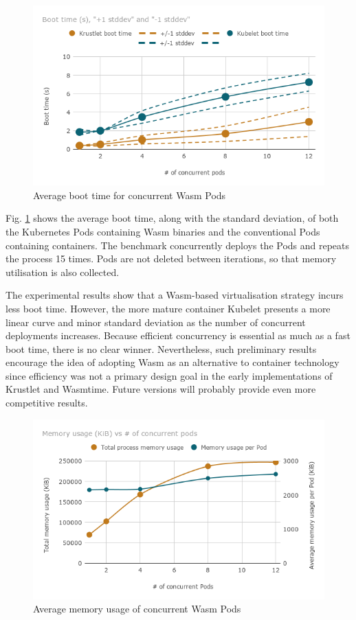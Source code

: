 \begin{figure}[ht]
\centering
\includegraphics[width=\columnwidth]{figures/b-krustlet-1}
\caption{Average boot time for concurrent Wasm Pods \label{fig:b-krustlet-1}}
\end{figure}

Fig. \ref{fig:b-krustlet-1} shows the average boot time, along with the standard deviation, of both the Kubernetes Pods containing Wasm binaries and the conventional Pods containing containers. The benchmark concurrently deploys the Pods and repeats the process 15 times. Pods are not deleted between iterations, so that memory utilisation is also collected.

The experimental results show that a Wasm-based virtualisation strategy incurs less boot time. However, the more mature container Kubelet presents a more linear curve and minor standard deviation as the number of concurrent deployments increases. Because efficient concurrency is essential as much as a fast boot time, there is no clear winner. Nevertheless, such preliminary results encourage the idea of adopting Wasm as an alternative to container technology since efficiency was not a primary design goal in the early implementations of Krustlet and Wasmtime. Future versions will probably provide even more competitive results.

\begin{figure}[ht]
\centering
\includegraphics[width=\columnwidth]{figures/b-krustlet-2}
\caption{Average memory usage of concurrent Wasm Pods \label{fig:b-krustlet-2}}
\end{figure}

